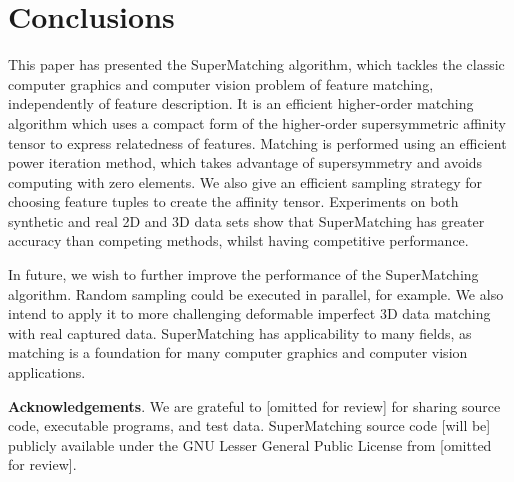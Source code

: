 \section{Conclusions}
\label{sec:conclusion}

This paper has presented the SuperMatching algorithm,
which tackles the classic computer graphics and computer vision problem of feature matching, independently of feature description.
It is an efficient higher-order matching algorithm which uses a compact form of the higher-order supersymmetric affinity tensor to express relatedness of features.
Matching is performed using an efficient power iteration method, which takes advantage of supersymmetry and avoids computing with zero elements.
We also give an efficient sampling strategy for choosing feature tuples to create the affinity tensor.
Experiments on both synthetic and real 2D and 3D data sets show that
SuperMatching has greater accuracy than competing methods, whilst having competitive performance.

In future, we wish to further improve the performance of the SuperMatching algorithm.
Random sampling could be executed in parallel, for example. 
We also intend to apply it to more challenging deformable imperfect 3D data matching with real captured data.
SuperMatching has applicability to many fields,
as matching is a foundation for many computer graphics and computer vision applications.


\textbf{Acknowledgements}. We are grateful to [omitted for review] for sharing source code, executable programs, and test data.
SuperMatching source code [will be] publicly available under the GNU Lesser General Public License from [omitted for review].

